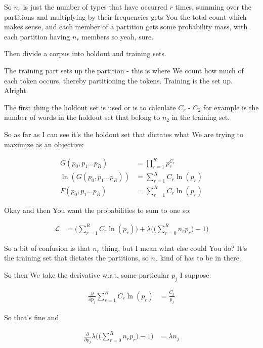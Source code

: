 \documentclass{article}
\begin{document}
		So $n_r$ is just the number of types that have occurred $r$ times, summing over the partitions and multiplying by their frequencies gets You the total count which makes sense, and each member of a partition gets some probability mass, with each partition having $n_r$ members so yeah, sure.
		
		Then divide a corpus into holdout and training sets.
		
		The training part sets up the partition - this is where We count how much of each token occurs, thereby partitioning the tokens. Training is the set up. Alright.
		
		The first thing the holdout set is used or is to calculate $C_r$ - $C_2$ for example is the number of words in the holdout set that belong to $n_2$ in the training set. 
		
		So as far as I can see it's the holdout set that dictates what We are trying to maximize as an objective:
		
		\begin{align}
			G(p_0, p_1\ldots p_R) &= \prod^R_{r=1} p_r^{C_r}\\
			\ln(G(p_0, p_1\ldots p_R)) &= \sum^R_{r=1} C_r\ln(p_r)\\
			F(p_0, p_1\ldots p_R) &= \sum^R_{r=1} C_r\ln(p_r)
		\end{align}
		
		Okay and then You want the probabilities to sum to one so:
		
		\begin{align}
			\mathcal{L} &= \bigg(\sum^R_{r=1} C_r\ln(p_r)\bigg) + \lambda \bigg(\bigg(\sum^R_{r=0} n_r p_r\bigg)-1\bigg)
		\end{align}
		
		So a bit of confusion is that $n_r$ thing, but I mean what else could You do? It's the training set that dictates the partitions, so $n_r$ kind of has to be in there.
		
		So then We take the derivative w.r.t. some particular $p_j$ I suppose:
		
		\begin{align}
			\frac{\partial}{\partial p_j} \sum^R_{r=1} C_r\ln(p_r) &= \frac{C_j}{p_j}
		\end{align}
		
		So that's fine and
		
		\begin{align}
			\frac{\partial}{\partial p_j} \lambda \bigg(\bigg(\sum^R_{r=0} n_r p_r\bigg)-1\bigg) &= \lambda n_j
		\end{align}
		
\end{document}

